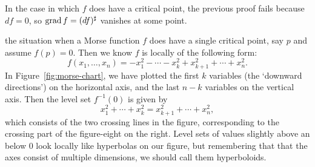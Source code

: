 In the case in which $f$ does have a critical point, the previous proof fails because $df = 0$, so $\operatorname{grad} f = (df)^{\sharp}$ vanishes at some point.


 the situation when a Morse function $f$ does have a single critical point, say $p$ and assume $f(p) = 0$.
Then we know $f$ is locally of the following form:
\[
    f(x_1, \ldots, x_n) = - x_1^2 - \cdots - x_k^2 + x_{k+1}^2 + \cdots + x_n^2
.\] 
In Figure~\ref{fig:morse-chart}, we have plotted the first $k$ variables (the `downward directions') on the horizontal axis, and the last $n-k$ variables on the vertical axis.
Then the level set $f^{-1}(0)$ is given by
\[
x_1^2 + \cdots + x_k^2 = x_{k+1} ^2 + \cdots + x_n^2
,\] 
which consists of the two crossing lines in the figure, corresponding to the crossing part of the figure-eight on the right.
Level sets of values slightly above an below $0$ look locally like hyperbolas on our figure, but remembering that that the axes consist of multiple dimensions, we should call them hyperboloids.
\begin{figure}[H]
    \centering
\end{figure}

